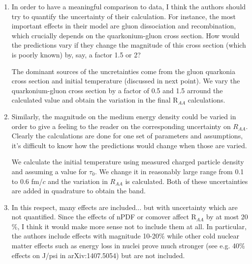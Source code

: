 \documentclass[aps,prc,preprint,superscriptaddress,showpacs,showkeys]{revtex4-1}
\begin{document}
\begin{enumerate}

\item { \color{red} In order to have a meaningful comparison to data, I think the
authors should try to quantify the uncertainty of their calculation.
For instance, the most important effects in their model are gluon
dissociation and recombination, which crucially depends on the
quarkonium-gluon cross section. How would the predictions vary if they
change the magnitude of this cross section (which is poorly known) by,
say, a factor 1.5 or 2?}

{ \color{blue} 
  The dominant sources of the uncretainties come from the gluon quarkonia cross section and initial temperature 
(discussed in next point). We vary the quarkonium-gluon cross section by a factor of 0.5 and 1.5 arround the
calculated value and obtain the variation in the final R$_{AA}$ calculations.   
}

\item { \color{red} Similarly, the magnitude on the medium energy density could be
varied in order to give a feeling to the reader on the corresponding
uncertainty on $R_{AA}$. Clearly the calculations are done for one set
of parameters and assumptions, it's difficult to know how the
predictions would change when those are varied.}


{ \color{blue} We calculate the initial temperature using 
measured charged particle density and assuming a value for $\tau_0$. 
We change it in reasonably large range from 0.1 to 0.6 fm/$c$ and the variation in  
$R_{AA}$ is calculated.
 Both of these uncertainties are added in quadrature to obtain the band. 


}

\item { \color{red} In this respect, many effects are included... but with uncertainty
which are not quantified. Since the effects of nPDF or comover affect
R$_{AA}$ by at most 20$\%$, I think it would make more sense not to include
them at all. In particular, the authors include effects with magnitude
10-20$\%$ while other cold nuclear matter effects such as energy loss in
nuclei prove much stronger (see e.g. 40$\%$ effects on J/psi in
arXiv:1407.5054) but are not included.}


\end{enumerate}
\end{document}
